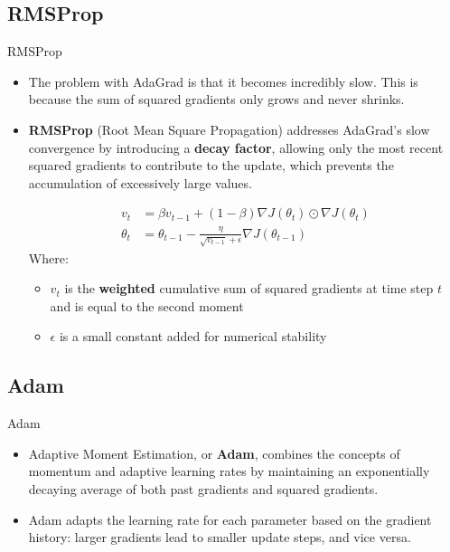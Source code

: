 \documentclass[serif, aspectratio=169]{beamer}
\begin{document}
\subsection{RMSProp}
\begin{frame}{RMSProp}
    \begin{itemize}
        \item The problem with AdaGrad is that it becomes incredibly slow. This is because the sum of squared gradients only grows and never shrinks.
        \item \textbf{RMSProp} (Root Mean Square Propagation) addresses AdaGrad's slow convergence by introducing a \textbf{decay factor}, allowing only the most recent squared gradients to contribute to the update, which prevents the accumulation of excessively large values.

        \begin{align*}
        v_t &= \beta v_{t-1} + (1 - \beta) \nabla J(\theta_t) \odot \nabla J(\theta_t) \\
        \theta_{t} &= \theta_{t-1}- \frac{\eta}{\sqrt{v_{t-1}} + \epsilon} \nabla J(\theta_{t-1})
        \end{align*}
        Where:
        \begin{itemize}
            \item $v_t$ is the \textbf{weighted} cumulative sum of squared gradients at time step $t$ and is equal to the second moment
            \item $\epsilon$ is a small constant added for numerical stability
        \end{itemize}
    \end{itemize}
\end{frame}

\subsection{Adam}
\begin{frame}{Adam}
    \begin{itemize}
        \item Adaptive Moment Estimation, or \textbf{Adam}, combines the concepts of momentum and adaptive learning rates by maintaining an exponentially decaying average of both past gradients and squared gradients.
        \item Adam adapts the learning rate for each parameter based on the gradient history: larger gradients lead to smaller update steps, and vice versa.
    \end{itemize}
\end{frame}
\end{document}
